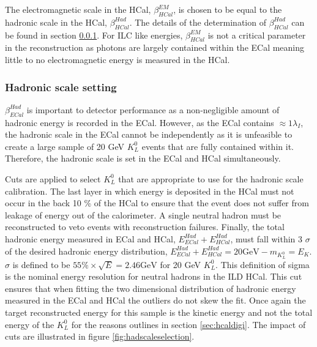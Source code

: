 The electromagnetic scale in the HCal, $\beta^{EM}_{HCal}$, is chosen to be equal to the hadronic scale in the HCal, $\beta^{Had}_{HCal}$.  The details of the determination of $\beta^{Had}_{HCal}$ can be found in section \ref{sec:hadscalesetting}.  For ILC like energies, $\beta^{EM}_{HCal}$ is not a critical parameter in the reconstruction as photons are largely contained within the ECal meaning little to no electromagnetic energy is measured in the HCal.  


\subsubsection{Hadronic scale setting}
\label{sec:hadscalesetting}
$\beta^{Had}_{ECal}$ is important to detector performance as a non-negligible amount of hadronic energy is recorded in the ECal.  However, as the ECal contains $\approx 1 \lambda_{I}$, the hadronic scale in the ECal cannot be independently as it is unfeasible to create a large sample of 20 GeV $K^{0}_{L}$ events that are fully contained within it.  Therefore, the hadronic scale is set in the ECal and HCal simultaneously.  

Cuts are applied to select $K^{0}_{L}$ that are appropriate to use for the hadronic scale calibration.  The last layer in which energy is deposited in the HCal must not occur in the back 10 \% of the HCal to ensure that the event does not suffer from leakage of energy out of the calorimeter.  A single neutral hadron must be reconstructed to veto events with reconstruction failures.  Finally, the total hadronic energy measured in ECal and HCal, $E^{Had}_{ECal} + E^{Had}_{HCal}$, must fall within 3 $\sigma$ of the desired hadronic energy distribution, $E^{Had}_{ECal} + E^{Had}_{HCal} = 20 \text {GeV} - m_{K^{0}_{L}} = E_{K}$.  $\sigma$ is defined to be $55\% \times \sqrt{E} = 2.46 \text{GeV}$ for 20 GeV $K^{0}_{L}$.  This definition of sigma is the nominal energy resolution for neutral hadrons in the ILD HCal.  This cut ensures that when fitting the two dimensional distribution of hadronic energy measured in the ECal and HCal the outliers do not skew the fit.  Once again the target reconstructed energy for this sample is the kinetic energy and not the total energy of the $K^{0}_{L}$ for the reasons outlines in section \ref{sec:hcaldigi}.  The impact of cuts are illustrated in figure \ref{fig:hadscaleselection}.

